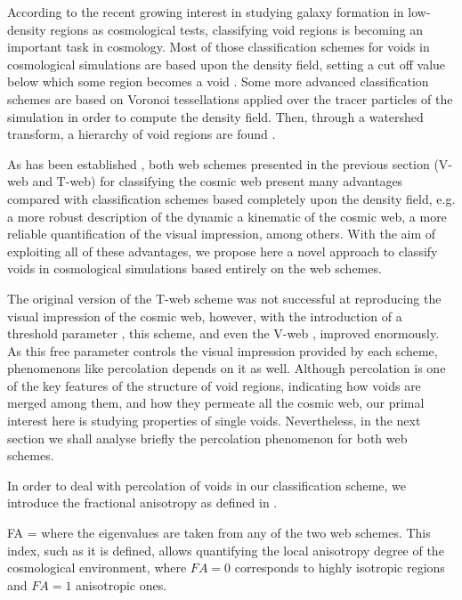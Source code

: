 \documentclass[a4,useAMS,usenatbib,usegraphicx]{latex/mn2e}
\begin{document}
According to the recent growing interest in studying galaxy formation in 
low-density regions as cosmological tests, classifying void regions is 
becoming an important task in cosmology. Most of those classification 
schemes for voids in cosmological simulations are based upon the density 
field, setting a cut off value below which some region becomes a void 
\SRKED{[references]}. Some more advanced classification schemes are based 
on Voronoi tessellations applied over the tracer particles of the 
simulation in order to compute the density field. Then, through a watershed 
transform, a hierarchy of void regions are found .


As has been established \SRKED{[references]}, both web schemes presented 
in the previous section (V-web and T-web) for classifying the cosmic web 
present many advantages compared with classification schemes based
completely upon the density field, e.g. a more robust description of the
dynamic a kinematic of the cosmic web, a more reliable quantification of 
the visual impression, among others. With the aim of exploiting all of 
these advantages, we propose here a novel approach to classify voids in
cosmological simulations based entirely on the web schemes.


The original version of the T-web scheme  was not
successful at reproducing the visual impression of the cosmic web, 
however, with the introduction of a threshold parameter , this scheme, and even the V-web , improved enormously. As this free parameter controls the visual 
impression provided by each scheme, phenomenons like percolation depends 
on it as well. Although percolation is one of the key features of the 
structure of void regions, indicating how voids are merged among them, and 
how they permeate all the cosmic web, our primal interest here is studying 
properties of single voids. Nevertheless, in the next section we shall 
analyse briefly the percolation phenomenon for both web schemes.


In order to deal with percolation of voids in our classification scheme,
we introduce the fractional anisotropy as defined in .


{ FA =  }
where the eigenvalues are taken from any of the two web schemes. This 
index, such as it is defined, allows quantifying the local anisotropy 
degree of the cosmological environment, where $FA=0$ corresponds to highly
isotropic regions and $FA=1$ anisotropic ones.
\end{document}
